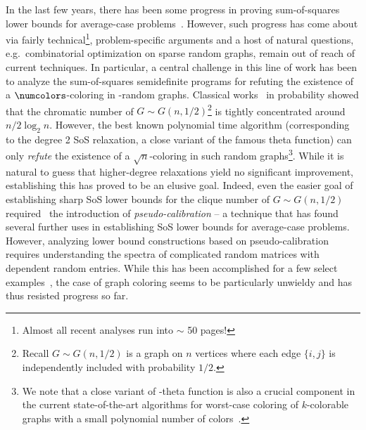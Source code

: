 In the last few years, there has been some progress in proving sum-of-squares lower bounds for average-case problems~\cite{MR1880908-Grigoriev01,MR1875740-Grigoriev02,DBLP:conf/focs/Schoenebeck08,MR2780076-Tulsiani09,MR3388187-Barak15,DBLP:conf/focs/BarakHKKMP16,DBLP:conf/stoc/KothariMOW17,ghosh2020sumofsquares,10.1145/3357713.3384319}. However, such progress has come about via fairly technical\footnote{Almost all recent analyses run into $\sim$ 50 pages!}, problem-specific arguments and a host of natural questions, e.g.\ combinatorial optimization on sparse random graphs, remain out of reach of current techniques. In particular, a central challenge in this line of work has been to analyze the sum-of-squares semidefinite programs for refuting the existence of a $\numcolors$-coloring in \Erdos-\Renyi random graphs. Classical works~\cite{MR951992} in probability showed that the chromatic number of $G \sim G(n,1/2)$\footnote{Recall $G \sim G(n,1/2)$ is a graph on $n$ vertices where each edge $\{i,j\}$ is independently included with probability $1/2$.} is tightly concentrated around $n/2 \log_2 n$. However, the best known polynomial time algorithm (corresponding to the degree 2 SoS relaxation, a close variant of the famous \Lovasz theta function) can only \emph{refute} the existence of a $\sqrt{n}$-coloring in such random graphs\footnote{We note that a close variant of \Lovasz-theta function is also a crucial component in the current state-of-the-art algorithms for worst-case coloring of $k$-colorable graphs with a small polynomial number of colors~\cite{DBLP:journals/jacm/KargerMS98,MR2277147-Arora06,DBLP:conf/focs/Chlamtac07}.}. While it is natural to guess that higher-degree relaxations yield no significant improvement, establishing this has proved to be an elusive goal. Indeed, even the easier goal of establishing sharp SoS lower bounds for the clique number of $G \sim G(n,1/2)$ required~\cite{DBLP:conf/focs/BarakHKKMP16} the introduction of \emph{pseudo-calibration} -- a technique that has found several further uses in establishing SoS lower bounds for average-case problems. However, analyzing lower bound constructions based on pseudo-calibration requires understanding the spectra of complicated random matrices with dependent random entries. While this has been accomplished for a few select examples~\cite{8104104,ghosh2020sumofsquares}, the case of graph coloring seems to be particularly unwieldy and has thus resisted progress so far. 

